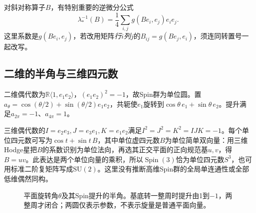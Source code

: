 对斜对称算子$B$，有特别重要的逆微分公式
\begin{equation}\label{eq:spin-lie-lift}
 \lambda_*^{-1}(B)=\frac14\sum_{i,j}g(Be_i,e_j)e_ie_j.
\end{equation}
这里系数是$g(Be_i,e_j)$，若改用矩阵\emph{行$i$列$j$}的$B_{ij}=g(Be_j,e_i)$，须连同转置号一起改写。

\subsection{二维的半角与三维四元数}
二维偶代数为$\mathbb R\langle1,e_1e_2\rangle$，$(e_1e_2)^2=-1$，故Spin群为单位圆。置$a_\theta=\cos(\theta/2)+\sin(\theta/2)e_1e_2$，共轭使$e_1$旋转到$\cos\theta\,e_1+\sin\theta\,e_2$。提升满足$a_{2\pi}=-1$、$a_{4\pi}=1$。

三维偶代数的$I=e_2e_3,J=e_3e_1,K=e_1e_2$满足$I^2=J^2=K^2=IJK=-1$。每个单位四元数可写为$\cos t+\sin t\,B$，其中单位虚四元数$B$为单位简单双向量：用三维Hodge星把$B$的系数识别为单位法向，再选其正交平面的正向规范基$u,v$，得$B=uv$。此表达是两个单位向量的乘积，所以$\operatorname{Spin}(3)$恰为单位四元数$S^3$，也可用标准二阶复矩阵写成$\mathrm{SU}(2)$。这里没有推断高维Spin群的全局单连通性或全部低维偶然同构。

\begin{figure}[htbp]
\centering
\caption{平面旋转角$\theta$及其Spin提升的半角。基底转一整周时提升由1到$-1$，两整周才闭合；两圆仅表示参数，不表示旋量是普通平面向量。}
\label{fig:spin-half-angle}
\end{figure}
